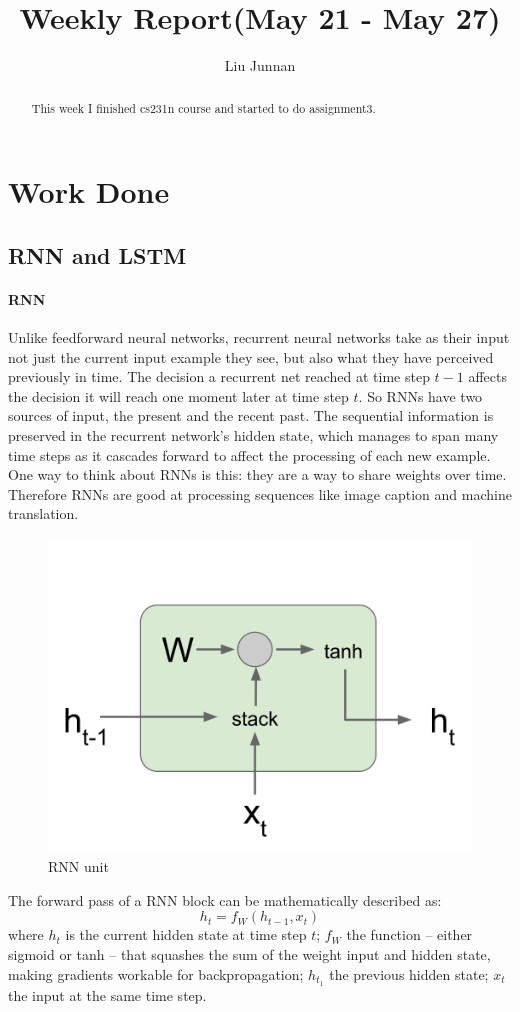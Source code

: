 \documentclass{article} %
\title{Weekly Report(May 21 - May 27)}
\author{
Liu Junnan
}
\begin{document}
\maketitle

\begin{abstract}
This week I finished cs231n course and started to do assignment3.
\end{abstract}

\section{Work Done}
\subsection{RNN and LSTM}
\paragraph{RNN}
Unlike feedforward neural networks, recurrent neural networks take as their input not just the current input example they see, but also what they have perceived previously in time. The decision a recurrent net reached at time step $t-1$ affects the decision it will reach one moment later at time step $t$. So RNNs have two sources of input, the present and the recent past. The sequential information is preserved in the recurrent network’s hidden state, which manages to span many time steps as it cascades forward to affect the processing of each new example. One way to think about RNNs is this: they are a way to share weights over time. Therefore RNNs are good at processing sequences like image caption and machine translation. 

\begin{figure}[H]
	\centering
	\includegraphics[width=.4\textwidth]{rnn.png}
	\caption{RNN unit}
\end{figure}

The forward pass of a RNN block can be mathematically described as:
$$h_t=f_W(h_{t-1},x_t)$$
where $h_t$ is the current hidden state at time step $t$; $f_W$ the function -- either sigmoid or tanh -- that squashes the sum of the weight input and hidden state,  making gradients workable for backpropagation; $h_{t_1}$ the previous hidden state; $x_t$ the input at the same time step.
\end{document}
